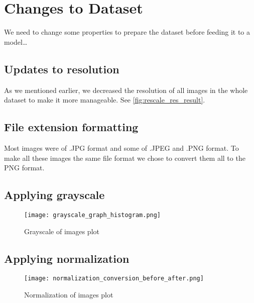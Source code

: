 \section{Changes to Dataset} %
We need to change some properties to prepare the dataset before feeding it to a model\dots

\subsection{Updates to resolution}
As we mentioned earlier, we decreased the resolution of all images in the whole dataset to make it more manageable. 
See \ref{fig:rescale_res_result}.

\subsection{File extension formatting}
\begin{fullwidth}
Most images were of .JPG format and some of .JPEG and .PNG format. To make all these images the same file format we chose to convert them all to the PNG format. 
\end{fullwidth}

\subsection{Applying grayscale}
\begin{figure}[H] %
	\texttt{[image: grayscale\_graph\_histogram.png]}
	\caption{Grayscale of images plot}
	\label{fig:grayscale_graph_histogram} %
\end{figure}

\newpage
\subsection{Applying normalization}
\begin{figure}[H] %
	\texttt{[image: normalization\_conversion\_before\_after.png]}
	\caption{Normalization of images plot}
	\label{fig:normalization_conversion_before_after} %
\end{figure}

